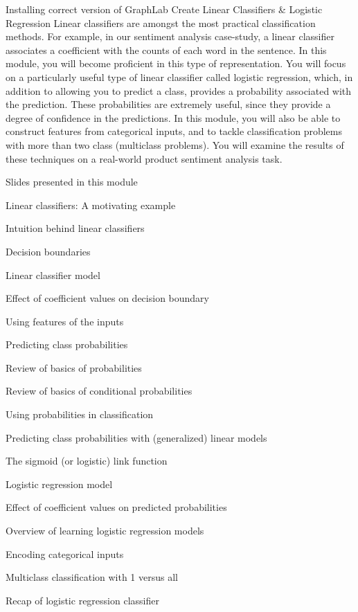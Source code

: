\item Installing correct version of GraphLab Create
Linear Classifiers & Logistic Regression
Linear classifiers are amongst the most practical classification methods. For example, in our sentiment analysis case-study, a linear classifier associates a coefficient with the counts of each word in the sentence. In this module, you will become proficient in this type of representation. You will focus on a particularly useful type of linear classifier called logistic regression, which, in addition to allowing you to predict a class, provides a probability associated with the prediction. These probabilities are extremely useful, since they provide a degree of confidence in the predictions. In this module, you will also be able to construct features from categorical inputs, and to tackle classification problems with more than two class (multiclass problems). You will examine the results of these techniques on a real-world product sentiment analysis task.
\item Slides presented in this module
\item Linear classifiers: A motivating example
\item Intuition behind linear classifiers
\item Decision boundaries
\item Linear classifier model
\item Effect of coefficient values on decision boundary
\item Using features of the inputs
\item Predicting class probabilities
\item Review of basics of probabilities
\item Review of basics of conditional probabilities
\item Using probabilities in classification
\item Predicting class probabilities with (generalized) linear models
\item The sigmoid (or logistic) link function
\item Logistic regression model
\item Effect of coefficient values on predicted probabilities
\item Overview of learning logistic regression models
\item Encoding categorical inputs
\item Multiclass classification with 1 versus all
\item Recap of logistic regression classifier
